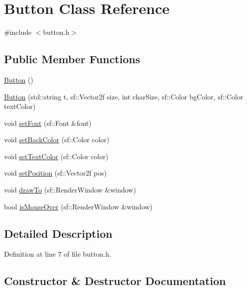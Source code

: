 \hypertarget{class_button}{}\section{Button Class Reference}
\label{class_button}


{\ttfamily \#include $<$button.\+h$>$}

\subsection*{Public Member Functions}
\begin{DoxyCompactItemize}
\item 
\mbox{\hyperlink{class_button_a3b36df1ae23c58aedb9e15a713159459}{Button}} ()
\item 
\mbox{\hyperlink{class_button_a7219fc574a2a6d3f77d4e83edb0ec909}{Button}} (std\+::string t, sf\+::\+Vector2f size, int char\+Size, sf\+::\+Color bg\+Color, sf\+::\+Color text\+Color)
\item 
void \mbox{\hyperlink{class_button_a155eee48a55f34915319d21460ce5955}{set\+Font}} (sf\+::\+Font \&font)
\item 
void \mbox{\hyperlink{class_button_aaebeadc6fedd71472ef452302278de44}{set\+Back\+Color}} (sf\+::\+Color color)
\item 
void \mbox{\hyperlink{class_button_a0cb69f44122ef0923e6a3ea1a198257a}{set\+Text\+Color}} (sf\+::\+Color color)
\item 
void \mbox{\hyperlink{class_button_a93438906f229fb6e2ba63103140dbd9f}{set\+Position}} (sf\+::\+Vector2f pos)
\item 
void \mbox{\hyperlink{class_button_a1feaea3cde433ed7d1ef1312a3893402}{draw\+To}} (sf\+::\+Render\+Window \&window)
\item 
bool \mbox{\hyperlink{class_button_a34779d5dfdc96291a25454975c14e2b2}{is\+Mouse\+Over}} (sf\+::\+Render\+Window \&window)
\end{DoxyCompactItemize}


\subsection{Detailed Description}


Definition at line 7 of file button.\+h.



\subsection{Constructor \& Destructor Documentation}
\mbox{\label{class_button_a3b36df1ae23c58aedb9e15a713159459}} 
